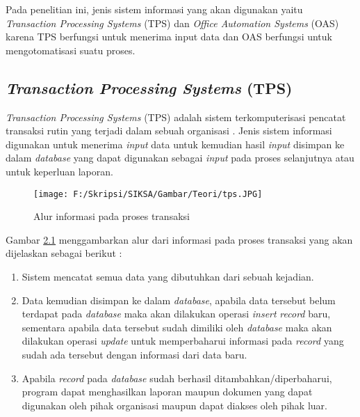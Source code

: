 	Pada penelitian ini, jenis sistem informasi yang akan digunakan yaitu \textit{Transaction Processing Systems} (TPS) dan \textit{Office Automation Systems} (OAS) karena TPS berfungsi untuk menerima input data dan OAS berfungsi untuk mengotomatisasi suatu proses.

\subsection{\textit{Transaction Processing Systems} (TPS)}
\label{sec:tps}
\textit{Transaction Processing Systems} (TPS) adalah sistem terkomputerisasi pencatat transaksi rutin yang terjadi dalam sebuah organisasi \cite{Laudon:1996}. Jenis sistem informasi digunakan untuk menerima \textit{input} data untuk kemudian hasil \textit{input} disimpan ke dalam \textit{database} yang dapat digunakan sebagai \textit{input} pada proses selanjutnya atau untuk keperluan laporan.

\begin{figure}[H]
	\centering
		\texttt{[image: F:/Skripsi/SIKSA/Gambar/Teori/tps.JPG]}
		{\caption{Alur informasi pada proses transaksi} \cite{Turban:2001}}
	\label{fig:tps}
\end{figure}

Gambar \hyperlink{tps}{2.1} menggambarkan alur dari informasi pada proses transaksi yang akan dijelaskan sebagai berikut : 
\begin{enumerate}
	\item Sistem mencatat semua data yang dibutuhkan dari sebuah kejadian.
	\item Data kemudian disimpan ke dalam \textit{database}, apabila data tersebut belum terdapat pada \textit{database} maka akan dilakukan operasi \textit{insert} \textit{record} baru, sementara apabila data tersebut sudah dimiliki oleh \textit{database} maka akan dilakukan operasi \textit{update} untuk memperbaharui informasi pada \textit{record} yang sudah ada tersebut dengan informasi dari data baru.
	\item Apabila \textit{record} pada \textit{database} sudah berhasil ditambahkan/diperbaharui, program dapat menghasilkan laporan maupun dokumen yang dapat digunakan oleh pihak organisasi maupun dapat diakses oleh pihak luar.
\end{enumerate}

